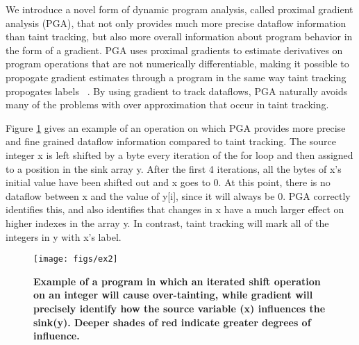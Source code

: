 \documentclass[conference]{IEEEtran}
\newcommand{\ttbf}[1]  {{\ttfamily\fontseries{m}\selectfont #1}}
\begin{document}
  We introduce a novel form of dynamic program analysis, called proximal gradient analysis (PGA), that not only provides much more precise dataflow information than taint tracking, but also more overall information about program behavior in the form of a gradient. PGA uses proximal gradients to estimate derivatives on program operations that are not numerically differentiable, making it possible to propogate gradient estimates through a program in the same way taint tracking propogates labels ~\cite{parikh2014proximal}. By using gradient to track dataflows, PGA naturally avoids many of the problems with over approximation that occur in taint tracking. 

Figure \ref{fig:ex_funcs} gives an example of an operation on which PGA provides more precise and fine grained dataflow information compared to taint tracking. The source integer \ttbf{x} is left shifted by a byte every iteration of the for loop and then assigned to a position in the sink array \ttbf{y}. After the first 4 iterations, all the bytes of \ttbf{x}'s initial value have been shifted out and \ttbf{x} goes to 0. At this point, there is no dataflow between \ttbf{x} and the value of \ttbf{y[i]}, since it will always be 0. PGA correctly identifies this, and also identifies that changes in \ttbf{x} have a much larger effect on higher indexes in the array \ttbf{y}. In contrast, taint tracking will mark all of the integers in \ttbf{y} with \ttbf{x}'s label. 

\begin{figure}
  \centering
    \texttt{[image: figs/ex2]}
  \vspace{-20pt}
   \caption{ \textbf{Example of a program in which an iterated shift operation on an integer will cause over-tainting, while gradient will precisely identify how the source variable (x) influences the sink(y). Deeper shades of red indicate greater degrees of influence.}}
  \label{fig:ex_funcs}
  \vspace{-20pt}
\end{figure}
\end{document}
